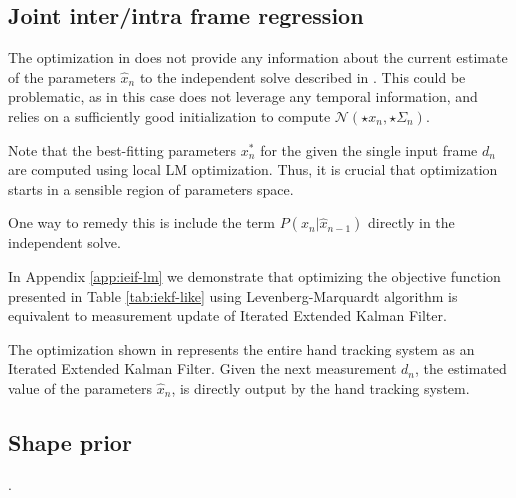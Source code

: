 
\subsection{Joint inter/intra frame regression}
The optimization in  does not provide any information about the current estimate of the parameters $\hat{x}_n$ to the independent solve described in . This could be problematic, as in this case  does not leverage any temporal information, and relies on a sufficiently good initialization to compute $\mathcal{N}(\star{x}_n, \star{\Sigma}_n)$.

\newpage

Note that the best-fitting parameters $x_n^*$ for the given the single input frame $d_n$ are computed using local LM optimization. Thus, it is crucial that optimization starts in a sensible region of parameters space. 

One way to remedy this is include the term $P(x_n |\hat{x}_{n - 1})$ directly in the independent solve.



In Appendix \ref{app:ieif-lm} we demonstrate that optimizing the objective function presented in Table \ref{tab:iekf-like} using Levenberg-Marquardt algorithm is equivalent to measurement update of Iterated Extended Kalman Filter.



The optimization shown in  represents the entire hand tracking system as an Iterated Extended Kalman Filter. Given the next measurement $d_n$, the estimated value of the parameters $\hat{x}_n$,  is directly output by the hand tracking system.

\subsection{Shape prior}
\label{sec:shapeprior}
. 
